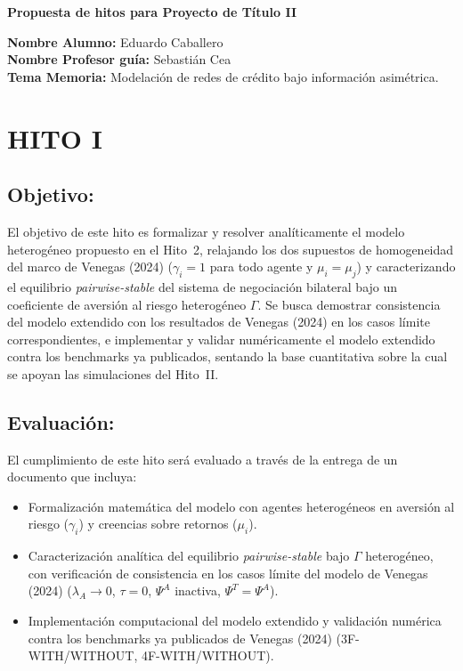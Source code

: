 \documentclass[12pt,a4paper]{article}
\begin{document}
\begin{center}
{\Large\bfseries Propuesta de hitos para Proyecto de T\'itulo II}
\end{center}

\vspace{0.3cm}
\noindent\textbf{Nombre Alumno:} Eduardo Caballero\\
\textbf{Nombre Profesor gu\'ia:} Sebasti\'an Cea\\
\textbf{Tema Memoria:} Modelaci\'on de redes de cr\'edito bajo informaci\'on asim\'etrica.

\section*{HITO I}

\subsection*{Objetivo:}

El objetivo de este hito es formalizar y resolver anal\'iticamente el modelo heterog\'eneo
propuesto en el Hito~2, relajando los dos supuestos de homogeneidad del marco de Venegas
(2024) ($\gamma_i = 1$ para todo agente y $\mu_i = \mu_j$) y caracterizando el equilibrio
\emph{pairwise-stable} del sistema de negociaci\'on bilateral bajo un coeficiente de
aversi\'on al riesgo heterog\'eneo $\Gamma$. Se busca demostrar consistencia del modelo
extendido con los resultados de Venegas (2024) en los casos l\'imite correspondientes, e
implementar y validar num\'ericamente el modelo extendido contra los benchmarks ya
publicados, sentando la base cuantitativa sobre la cual se apoyan las simulaciones del
Hito~II.

\subsection*{Evaluaci\'on:}

El cumplimiento de este hito ser\'a evaluado a trav\'es de la entrega de un documento que
incluya:
\begin{itemize}
    \item Formalizaci\'on matem\'atica del modelo con agentes heterog\'eneos en aversi\'on al
    riesgo ($\gamma_i$) y creencias sobre retornos ($\mu_i$).
    \item Caracterizaci\'on anal\'itica del equilibrio \emph{pairwise-stable} bajo $\Gamma$
    heterog\'eneo, con verificaci\'on de consistencia en los casos l\'imite del modelo de
    Venegas (2024) ($\lambda_A \to 0$, $\tau = 0$, $\Psi^A$ inactiva, $\Psi^T = \Psi^A$).
    \item Implementaci\'on computacional del modelo extendido y validaci\'on num\'erica contra
    los benchmarks ya publicados de Venegas (2024) (3F-WITH/WITHOUT, 4F-WITH/WITHOUT).
\end{itemize}
\end{document}
